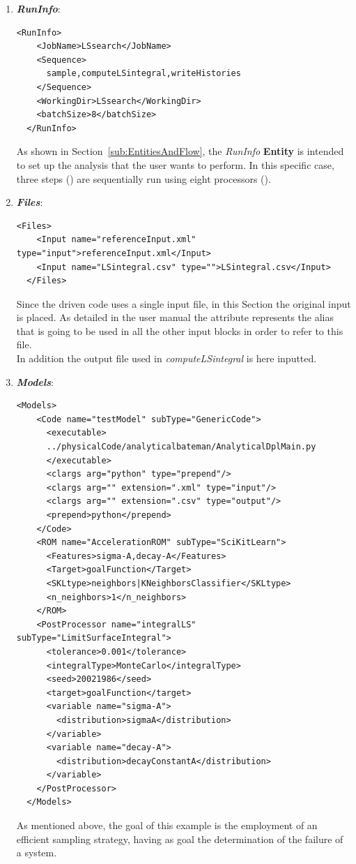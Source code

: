 \begin{enumerate}
   \item \textbf{\textit{RunInfo}}:
\begin{lstlisting}[style=XML,morekeywords={arg,extension,pauseAtEnd,overwrite}]
  <RunInfo>
    <JobName>LSsearch</JobName>
    <Sequence>
      sample,computeLSintegral,writeHistories
    </Sequence>
    <WorkingDir>LSsearch</WorkingDir>
    <batchSize>8</batchSize>
  </RunInfo>
\end{lstlisting}   
   As shown in Section~\ref{sub:EntitiesAndFlow}, the \textit{RunInfo} \textbf{Entity} is intended to set up the analysis 
   that the user wants to perform. In this specific case, three steps () are  sequentially run 
   using eight processors (). 
   \item \textbf{\textit{Files}}:
\begin{lstlisting}[style=XML,morekeywords={arg,extension,pauseAtEnd,overwrite}]
  <Files>
    <Input name="referenceInput.xml" type="input">referenceInput.xml</Input>
    <Input name="LSintegral.csv" type="">LSintegral.csv</Input>
  </Files>
\end{lstlisting}
   Since the driven code uses a single input file, in this Section the original input is placed. As detailed in the user manual
   the attribute   represents the alias that is going to be 
   used in all the other input blocks in order to refer to this file. 
   \\In addition the output file used in  
   \textit{computeLSintegral} is here inputted.
   \item \textbf{\textit{Models}}:
\begin{lstlisting}[style=XML,morekeywords={arg,extension,pauseAtEnd,overwrite}]
  <Models>
    <Code name="testModel" subType="GenericCode">
      <executable>
      ../physicalCode/analyticalbateman/AnalyticalDplMain.py
      </executable>
      <clargs arg="python" type="prepend"/>
      <clargs arg="" extension=".xml" type="input"/>
      <clargs arg="" extension=".csv" type="output"/>
      <prepend>python</prepend>
    </Code>
    <ROM name="AccelerationROM" subType="SciKitLearn">
      <Features>sigma-A,decay-A</Features>
      <Target>goalFunction</Target>
      <SKLtype>neighbors|KNeighborsClassifier</SKLtype>
      <n_neighbors>1</n_neighbors>
    </ROM>
    <PostProcessor name="integralLS" subType="LimitSurfaceIntegral">
      <tolerance>0.001</tolerance>
      <integralType>MonteCarlo</integralType>
      <seed>20021986</seed>
      <target>goalFunction</target>
      <variable name="sigma-A">
        <distribution>sigmaA</distribution>
      </variable>
      <variable name="decay-A">
        <distribution>decayConstantA</distribution>
      </variable>
    </PostProcessor>
  </Models>
\end{lstlisting}
 As mentioned above, the goal of this example is the employment of 
 an efficient sampling strategy, having as goal the determination of the
 failure of a system.
 

\end{enumerate}
